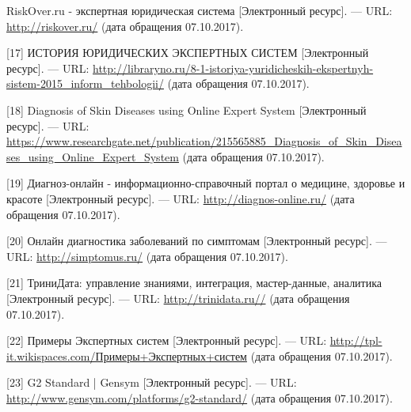 \documentclass[14pt,a4paper,report]{report}
\begin{document}
\begin{flushleft}
[16] RiskOver.ru - экспертная юридическая система [Электронный ресурс]. — URL: \href{http://riskover.ru/}{http://riskover.ru/} (дата обращения 07.10.2017). \linebreak

[17] ИСТОРИЯ ЮРИДИЧЕСКИХ ЭКСПЕРТНЫХ СИСТЕМ [Электронный ресурс]. — URL: \href{http://libraryno.ru/8-1-istoriya-yuridicheskih-ekspertnyh-sistem-2015_inform_tehbologii/}{http://libraryno.ru/8-1-istoriya-yuridicheskih-ekspertnyh-sistem-2015\_inform\_tehbologii/} (дата обращения 07.10.2017). \linebreak

[18] Diagnosis of Skin Diseases using Online Expert System [Электронный ресурс]. — URL: \href{https://www.researchgate.net/publication/215565885_Diagnosis_of_Skin_Diseases_using_Online_Expert_System}{https://www.researchgate.net/publication/215565885\_Diagnosis\_of\_Skin\_Diseases\_using\_Online\_Expert\_System} (дата обращения 07.10.2017). \linebreak

[19] Диагноз-онлайн - информационно-справочный портал о медицине, здоровье и красоте [Электронный ресурс]. — URL: \href{http://diagnos-online.ru/}{http://diagnos-online.ru/} (дата обращения 07.10.2017). \linebreak

[20] Онлайн диагностика заболеваний по симптомам [Электронный ресурс]. — URL: \href{http://simptomus.ru/}{http://simptomus.ru/} (дата обращения 07.10.2017). \linebreak

[21] ТриниДата: управление знаниями, интеграция, мастер-данные, аналитика [Электронный ресурс]. — URL: \href{http://trinidata.ru/}{http://trinidata.ru//} (дата обращения 07.10.2017). \linebreak

[22] Примеры Экспертных систем [Электронный ресурс]. — URL: \href{http://tpl-it.wikispaces.com/\%D0\%9F\%D1\%80\%D0\%B8\%D0\%BC\%D0\%B5\%D1\%80\%D1\%8B+\%D0\%AD\%D0\%BA\%D1\%81\%D0\%BF\%D0\%B5\%D1\%80\%D1\%82\%D0\%BD\%D1\%8B\%D1\%85+\%D1\%81\%D0\%B8\%D1\%81\%D1\%82\%D0\%B5\%D0\%BC}{http://tpl-it.wikispaces.com/Примеры+Экспертных+систем} (дата обращения 07.10.2017). \linebreak

[23] G2 Standard | Gensym [Электронный ресурс]. — URL: \href{http://www.gensym.com/platforms/g2-standard/}{http://www.gensym.com/platforms/g2-standard/} (дата обращения 07.10.2017). \linebreak


\end{flushleft}
\end{document}
